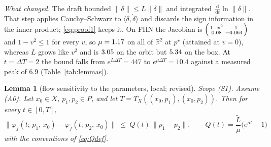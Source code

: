 \documentclass[11pt]{article}
\newtheorem{lemma}{Lemma}
\theoremstyle{remark}\newtheorem{remark}{Remark}
\newcommand{\pstar}{p^\star}
\newcommand{\norm}[1]{\lVert #1\rVert}
\newcommand{\flow}[3]{\varphi_f(#1;\,#2,\,#3)}
\newcommand{\dd}{\,\mathrm{d}}
\newcommand{\rev}[1]{\textcolor{blue!55!black}{#1}}
\begin{document}
\emph{What changed.} The draft bounded $\norm{\dot\delta}\le L\norm\delta$ and integrated $\tfrac{\dd}{\dd t}\ln\norm\delta$. That step applies Cauchy--Schwarz to $\langle\delta,\dot\delta\rangle$ and discards the sign information in the inner product; \eqref{eq:proof1} keeps it. On FHN the Jacobian is $\begin{psmallmatrix}1-v^2&-1\\0.08&-0.064\end{psmallmatrix}$ and $1-v^2\le1$ for every $v$, so $\mu=1.17$ on all of $\mathbb R^2$ at $\pstar$ (attained at $v=0$), whereas $L$ grows like $v^2$ and is $3.05$ on the orbit but $5.34$ on the box. At $t=\Delta T=2$ the bound falls from $e^{L\Delta T}=447$ to $e^{\mu\Delta T}=10.4$ against a measured peak of $6.9$ (Table~\ref{tab:lemmas}).

\begin{lemma}[flow sensitivity to the parameters, local; \rev{revised}]\label{lem:param}
\emph{Scope (S1).} Assume (A0). Let $x_0\in X$, $p_1,p_2\in P$, and let $T=T_X((x_0,p_1),(x_0,p_2))$. Then for every $t\in[0,T]$,
\begin{equation}
\norm{\flow{t}{p_1}{x_0}-\flow{t}{p_2}{x_0}}\ \le\ Q(t)\,\norm{p_1-p_2},
\qquad Q(t)=\frac{\tilde L}{\mu}\big(e^{\mu t}-1\big)
\label{eq:lemma2}
\end{equation}
with the conventions of \eqref{eq:Qdef}.
\end{lemma}
\end{document}
